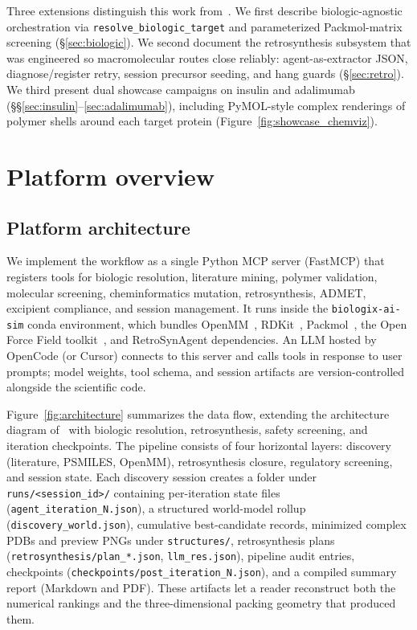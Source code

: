 \documentclass[twocolumn]{fairmeta}
\begin{document}
Three extensions distinguish this work from~\cite{martins2026insulin}.
We first describe biologic-agnostic orchestration via \texttt{resolve\_biologic\_target} and parameterized Packmol-matrix screening (\S\ref{sec:biologic}).
We second document the retrosynthesis subsystem that was engineered so macromolecular routes close reliably: agent-as-extractor JSON, diagnose/register retry, session precursor seeding, and hang guards (\S\ref{sec:retro}).
We third present dual showcase campaigns on insulin and adalimumab (\S\S\ref{sec:insulin}--\ref{sec:adalimumab}), including PyMOL-style complex renderings of polymer shells around each target protein (Figure~\ref{fig:showcase_chemviz}).

\section{Platform overview}
\label{sec:platform}

\subsection{Platform architecture}

We implement the workflow as a single Python MCP server (FastMCP) that registers tools for biologic resolution, literature mining, polymer validation, molecular screening, cheminformatics mutation, retrosynthesis, ADMET, excipient compliance, and session management.
It runs inside the \texttt{biologix-ai-sim} conda environment, which bundles OpenMM~\cite{eastman2017openmm}, RDKit~\cite{landrum2013rdkit}, Packmol~\cite{packmol2009}, the Open Force Field toolkit~\cite{qiu2021development}, and RetroSynAgent dependencies.
An LLM hosted by OpenCode (or Cursor) connects to this server and calls tools in response to user prompts; model weights, tool schema, and session artifacts are version-controlled alongside the scientific code.

Figure~\ref{fig:architecture} summarizes the data flow, extending the architecture diagram of~\cite{martins2026insulin} with biologic resolution, retrosynthesis, safety screening, and iteration checkpoints.
The pipeline consists of four horizontal layers: discovery (literature, PSMILES, OpenMM), retrosynthesis closure, regulatory screening, and session state.
Each discovery session creates a folder under \texttt{runs/<session\_id>/} containing per-iteration state files (\texttt{agent\_iteration\_N.json}), a structured world-model rollup (\texttt{discovery\_world.json}), cumulative best-candidate records, minimized complex PDBs and preview PNGs under \texttt{structures/}, retrosynthesis plans (\texttt{retrosynthesis/plan\_*.json}, \texttt{llm\_res.json}), pipeline audit entries, checkpoints (\texttt{checkpoints/post\_iteration\_N.json}), and a compiled summary report (Markdown and PDF).
These artifacts let a reader reconstruct both the numerical rankings and the three-dimensional packing geometry that produced them.
\end{document}
